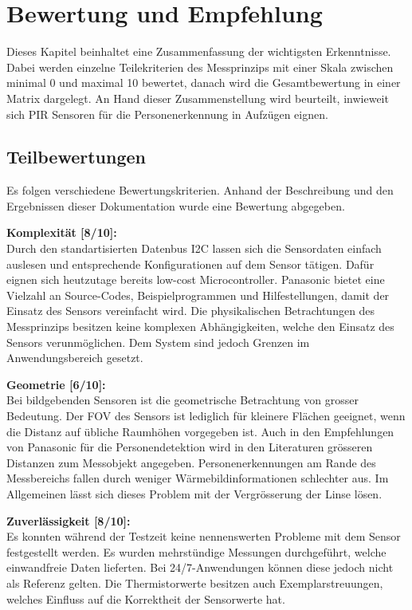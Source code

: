\chapter{Bewertung und Empfehlung}
\label{Empfehlung_Vorgehen}

Dieses Kapitel beinhaltet eine Zusammenfassung der wichtigsten Erkenntnisse. Dabei werden einzelne Teilekriterien des Messprinzips mit einer Skala zwischen minimal 0 und maximal 10  bewertet, danach wird die Gesamtbewertung in einer Matrix dargelegt. An Hand dieser Zusammenstellung wird beurteilt, inwieweit sich PIR Sensoren für die Personenerkennung in Aufzügen eignen. 

\section{Teilbewertungen}
\label{sec:Teilbewertung}

Es folgen verschiedene Bewertungskriterien. Anhand der Beschreibung und den Ergebnissen dieser Dokumentation wurde eine Bewertung abgegeben.

\textbf{Komplexität [8/10]:} \\
Durch den standartisierten Datenbus \ac{I2C} lassen sich die Sensordaten einfach auslesen und entsprechende Konfigurationen auf dem Sensor tätigen. Dafür eignen sich heutzutage bereits low-cost Microcontroller. Panasonic bietet eine Vielzahl an Source-Codes, Beispielprogrammen und Hilfestellungen, damit der Einsatz des Sensors vereinfacht wird. Die physikalischen Betrachtungen des Messprinzips besitzen keine komplexen Abhängigkeiten, welche den Einsatz des Sensors verunmöglichen. Dem System sind jedoch Grenzen im Anwendungsbereich gesetzt.

\textbf{Geometrie [6/10]:} \\
Bei bildgebenden Sensoren ist die geometrische Betrachtung von grosser Bedeutung. Der \ac{FOV} des Sensors ist lediglich für kleinere Flächen geeignet, wenn die Distanz auf übliche Raumhöhen vorgegeben ist. Auch in den Empfehlungen von Panasonic für die Personendetektion wird in den Literaturen grösseren Distanzen zum Messobjekt angegeben. Personenerkennungen am Rande des Messbereichs fallen durch weniger Wärmebildinformationen schlechter aus. Im Allgemeinen lässt sich dieses Problem mit der Vergrösserung der Linse lösen.

\textbf{Zuverlässigkeit [8/10]:} \\
Es konnten während der Testzeit keine nennenswerten Probleme mit dem Sensor festgestellt werden. Es wurden mehrstündige Messungen durchgeführt, welche einwandfreie Daten lieferten. Bei 24/7-Anwendungen können diese jedoch nicht als Referenz gelten. Die Thermistorwerte besitzen auch Exemplarstreuungen, welches Einfluss auf die Korrektheit der Sensorwerte hat.
  
